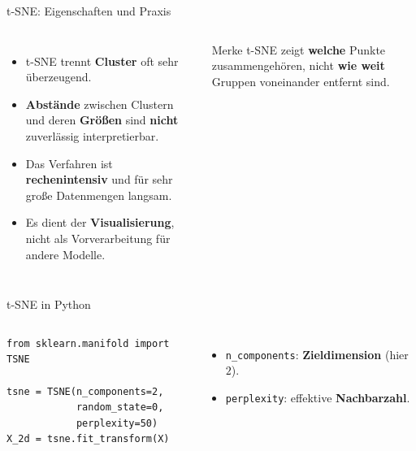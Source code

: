 \begin{frame}{t-SNE: Eigenschaften und Praxis}
\begin{columns}
\begin{itemize}
  \item t-SNE trennt \textbf{Cluster} oft sehr überzeugend.
  \item \textbf{Abstände} zwischen Clustern und deren \textbf{Größen} sind
        \textbf{nicht} zuverlässig interpretierbar.
  \item Das Verfahren ist \textbf{rechenintensiv} und für sehr große
        Datenmengen langsam.
  \item Es dient der \textbf{Visualisierung}, nicht als Vorverarbeitung für
        andere Modelle.
\end{itemize}

\begin{block}{Merke}
t-SNE zeigt \textbf{welche} Punkte zusammengehören, nicht \textbf{wie weit}
Gruppen voneinander entfernt sind.
\end{block}
\end{columns}
\end{frame}


\begin{frame}[fragile]{t-SNE in Python}
\begin{columns}
\centering


\begin{verbatim}
from sklearn.manifold import TSNE

tsne = TSNE(n_components=2,
            random_state=0,
            perplexity=50)
X_2d = tsne.fit_transform(X)
\end{verbatim}

\vspace{0.4em}
\footnotesize
\begin{itemize}
  \item \texttt{n\_components}: \textbf{Zieldimension} (hier $2$).
  \item \texttt{perplexity}: effektive \textbf{Nachbarzahl}.
\end{itemize}
\end{columns}
\end{frame}

\makequizpage{\QUIZURL}{\QUIZQRCODE}{\QUIZIMAGE}


